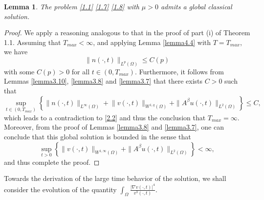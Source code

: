 \documentclass[12pt]{article}
\theoremstyle{plain}
\newtheorem{lemma}{Lemma}[section]
\theoremstyle{definition}
\numberwithin{equation}{section}
\begin{document}
\begin{lemma}\label{lemma4.5}
The problem \eqref{1.1} \eqref{1.7} \eqref{1.8} with  $\mu>0$ admits a global classical solution.
\end{lemma}
\begin{proof}
We apply a reasoning analogous to that in the proof of part (i) of Theorem 1.1. Assuming that
 $T_{max}<\infty$, and applying Lemma \ref{lemma4.4} with  $T=T_{max}$, we have
\begin{equation}\label{4.13}
\|n(\cdot,t)\|_{L^p(\Omega)} \leq C(p)
\end{equation}
with some $C(p)>0$
for all $t\in (0, T_{max})$. Furthermore, it follows from Lemmas \ref{lemma3.10}, \ref{lemma3.8} and \ref{lemma3.7} that there exists $C>0$ such that
\begin{equation*}
		\sup\limits_{t\in (0, T_{max})}\left\{ \|n(\cdot,t)\|_{L^{\infty}(\Omega)}\!
+\!\|v(\cdot,t)\|_{W^{1,q}(\Omega)}+\|A^\beta u(\cdot,t)\|_{L^2(\Omega)}
\right\}\leq C,
	\end{equation*}
which leads to a contradiction to \eqref{2.2} and thus the conclusion that $T_{max}=\infty$. Moreover, from the proof of Lemmas \ref{lemma3.8} and \ref{lemma3.7}, one can conclude that  this global solution is bounded in the sense that
 \begin{equation*}
	\sup_{t>0}\left\{\!\|v(\cdot,t)\|_{W^{1,\infty}(\Omega)}+\|A^\beta u(\cdot,t)\|_{L^2(\Omega)}\right\}< \infty,
\end{equation*}
and thus complete the proof.
\end{proof}

Towards the derivation of the large time behavior  of the solution,  %
  we shall  consider the evolution of the quantity
 $\int_\Omega \frac{|\nabla v(\cdot,t)|^4}{v^3(\cdot,t)}$.
\end{document}

